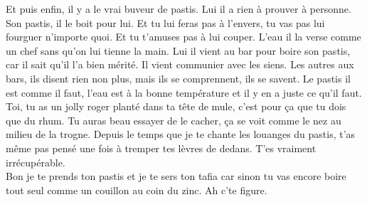 Et puis enfin, il y a le vrai buveur de pastis. Lui il a rien à prouver à personne. Son pastis, il le boit pour lui. Et tu lui feras pas à l’envers, tu vas pas lui fourguer n’importe quoi. Et tu t’amuses pas à lui couper. L’eau il la verse comme un chef sans qu’on lui tienne la main. Lui il vient au bar pour boire son pastis, car il sait qu’il l’a bien mérité. Il vient communier avec les siens. Les autres aux bars, ils disent rien non plus, mais ils se comprennent, ils se savent. Le pastis il est comme il faut, l’eau est à la bonne température et il y en a juste ce qu’il faut.\\
Toi, tu as un jolly roger planté dans ta tête de mule, c’est pour ça que tu dois que du rhum. Tu auras beau essayer de le cacher, ça se voit comme le nez au milieu de la trogne. Depuis le temps que je te chante les louanges du pastis, t’as même pas pensé une fois à tremper tes lèvres de dedans. T’es vraiment irrécupérable.\\
Bon je te prends ton pastis et je te sers ton tafia car sinon tu vas encore boire tout seul comme un couillon au coin du zinc. Ah c’te figure.\\
